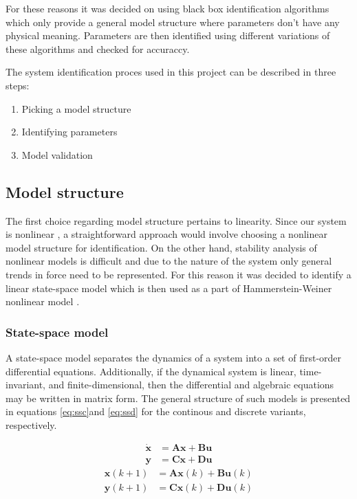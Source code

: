 For these reasons it was decided on using black box identification algorithms which only provide a general model structure where parameters don't have any physical meaning. 
Parameters are then identified using different variations of these algorithms and checked for accuraccy.

The system identification proces used in this project can be described in three steps:
\begin{enumerate}
\item Picking a model structure
\item Identifying parameters
\item Model validation
\end{enumerate}

\subsection{Model structure}\label{se:ms}
The first choice regarding model structure pertains to linearity.
Since our system is nonlinear , a straightforward approach would involve choosing a nonlinear model structure for identification.
On the other hand, stability analysis of nonlinear models is difficult and due to the nature of the system only general trends in force need to be represented.
For this reason it was decided to identify a linear state-space model which is then used as a part of Hammerstein-Weiner nonlinear model \cite{zhu2002estimation}.

\subsubsection{State-space model}
A state-space model separates the dynamics of a system into a set of first-order differential equations.
Additionally, if the dynamical system is linear, time-invariant, and finite-dimensional, then the differential and algebraic equations may be written in matrix form. The general structure of such models is presented in equations \ref{eq:ssc}and \ref{eq:ssd} for the continous and discrete variants, respectively.

\begin{align}\label{eq:ssc}
\dot{\mathbf{x}} &= \mathbf{A}\mathbf{x} + \mathbf{B}\mathbf{u} \\
\mathbf{y} &= \mathbf{C}\mathbf{x} + \mathbf{D}\mathbf{u}
\end{align}
\vspace{-0.5cm}
\begin{align}\label{eq:ssd}
\mathbf{x}(k+1) &= \mathbf{A}\mathbf{x}(k) + \mathbf{B}\mathbf{u}(k)\\
\mathbf{y}(k+1) &= \mathbf{C}\mathbf{x}(k) + \mathbf{D}\mathbf{u}(k)
\end{align}

